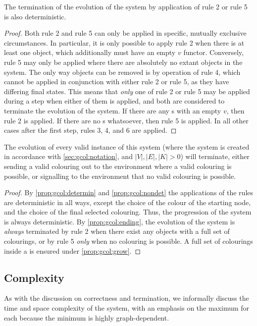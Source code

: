 \begin{proposition}\label{prop:gcol:ending}
The termination of the evolution of the system by application of rule 2 or rule 5 is also deterministic.
\end{proposition}

\begin{proof}
Both rule 2 and rule 5 can only be applied in specific, mutually exclusive circumstances.  In particular, it is only possible to apply rule 2 when there is at least one \bo{} object, which additionally must have an empty \(v\) functor.  Conversely, rule 5 may only be applied where there are absolutely no extant \bo{} objects in the system.  The only way \bo{} objects can be removed is by operation of rule 4, which cannot be applied in conjunction with either rule 2 or rule 5, as they have differing final states.  This means that \emph{only} one of rule 2 or rule 5 may be applied during a step when either of them is applied, and both are considered to terminate the evolution of the system.  If there are any \bo{}s with an empty \(v\), then rule 2 is applied.  If there are no \bo{}s whatsoever, then rule 5 is applied.  In all other cases after the first step, rules 3, 4, and 6 are applied.
\end{proof}

\begin{theorem}
The evolution of every valid instance of this system (where the system is created in accordance with \cref{sec:gcol:notation}, and \(|V|, |E|, |K| > 0\)) will terminate, either sending a valid colouring out to the environment where a valid colouring is possible, or signalling to the environment that no valid colouring is possible.
\end{theorem}

\begin{proof}
By \cref{prop:gcol:determin} and \cref{prop:gcol:nondet} the applications of the rules are deterministic in all ways, except the choice of the colour of the starting node, and the choice of the final selected colouring.  Thus, the progression of the system is always deterministic.  By \cref{prop:gcol:ending}, the evolution of the system is \emph{always} terminated by rule 2 when there exist any \bo{} objects with a full set of colourings, or by rule 5 \emph{only} when no colouring is possible.  A full set of colourings inside a \bo{} is ensured under \cref{prop:gcol:grow}.
\end{proof}

\subsection{Complexity}
As with the discussion on correctness and termination, we informally discuss the time and space complexity of the system, with an emphasis on the maximum for each because the minimum is highly graph-dependent.

